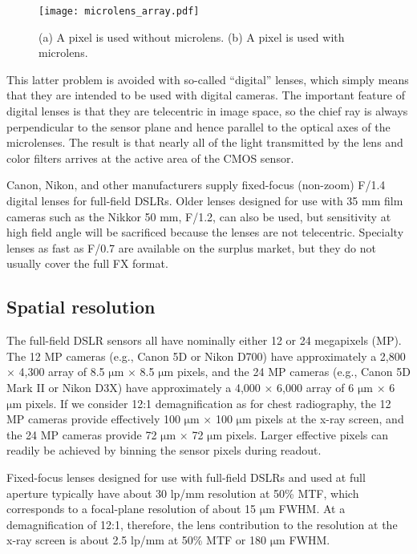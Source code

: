 \begin{figure}[h]
\centering
\texttt{[image: microlens\_array.pdf]}
\caption{(a) A pixel is used without microlens. (b) A pixel is used with microlens.}
\label{fig:microlensarray}
\end{figure}

This latter problem is avoided with so-called ``digital'' lenses, which simply means that they are intended to be used with digital cameras. The important feature of digital lenses is that they are telecentric in image space, so the chief ray is always perpendicular to the sensor plane and hence parallel to the optical axes of the microlenses. The result is that nearly all of the light transmitted by the lens and color filters arrives at the active area of the CMOS sensor. 

Canon, Nikon, and other manufacturers supply fixed-focus (non-zoom) F/1.4 digital lenses for full-field DSLRs. Older lenses designed for use with 35 mm film cameras such as the Nikkor 50 mm, F/1.2, can also be used, but sensitivity at high field angle will be sacrificed because the lenses are not telecentric. Specialty lenses as fast as F/0.7 are available on the surplus market, but they do not usually cover the full FX format.

\subsection{Spatial resolution}
\label{subsect:spatial_resolution}
The full-field DSLR sensors all have nominally either 12 or 24 megapixels (MP). The 12 MP cameras (e.g., Canon 5D or Nikon D700) have approximately a 2,800 $\times$ 4,300 array of 8.5 $\mathrm{\mu m}$ $\times$ 8.5 $\mathrm{\mu m}$ pixels, and the 24 MP cameras (e.g., Canon 5D Mark II or Nikon D3X) have approximately a 4,000 $\times$ 6,000 array of 6 $\mathrm{\mu m}$ $\times$ 6 $\mathrm{\mu m}$ pixels. If we consider 12:1 demagnification as for chest radiography, the 12 MP cameras provide effectively 100 $\mathrm{\mu m}$ $\times$ 100 $\mathrm{\mu m}$ pixels at the x-ray screen, and the 24 MP cameras provide 72 $\mathrm{\mu m}$ $\times$ 72 $\mathrm{\mu m}$ pixels. Larger effective pixels can readily be achieved by binning the sensor pixels during readout.

Fixed-focus lenses designed for use with full-field DSLRs and used at full aperture typically have about 30 lp/mm resolution at 50\% MTF, which corresponds to a focal-plane resolution of about 15 $\mathrm{\mu m}$ FWHM. At a demagnification of 12:1, therefore, the lens contribution to the resolution at the x-ray screen is about 2.5 lp/mm at 50\% MTF or 180 $\mathrm{\mu m}$ FWHM.

